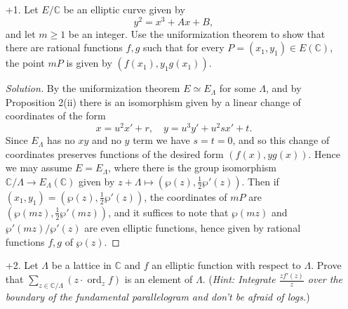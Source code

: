 \documentclass[a4paper]{article}
\theoremstyle{definition}
\DeclareMathOperator{\ord}{ord}
\newcommand{\C}{\mathbb{C}}
\begin{document}
\begin{enumerate}
    \item[+1.]
        Let $E/\C$ be an elliptic curve given by
        \begin{equation*}
            y^2 = x^3 + Ax + B,
        \end{equation*}
        and let $m\ge1$ be an integer. Use the uniformization theorem to show
        that there are rational functions $f,g$ such that for every
        $P=(x_1,y_1)\in E(\C)$, the point $mP$ is given by $(f(x_1),y_1g(x_1))$.

        \begin{proof}[Solution]
            By the uniformization theorem $E\simeq E_\Lambda$ for some $\Lambda$,
            and by Proposition 2(ii) there is an isomorphism given by a linear
            change of coordinates of the form
            \begin{equation*}
                x=u^2x'+r,\quad y=u^3y'+u^2sx'+t.
            \end{equation*}
            Since $E_\Lambda$ has no $xy$ and no $y$ term we have $s=t=0$, and
            so this change of coordinates preserves functions of the desired
            form $(f(x),yg(x))$. Hence we may assume $E=E_\Lambda$, where there
            is the group isomorphism $\C/\Lambda\to E_\Lambda(\C)$ given by
            $z+\Lambda\mapsto(\wp(z),\frac{1}{2}\wp'(z))$. Then if
            $(x_1,y_1)=(\wp(z),\frac{1}{2}\wp'(z))$, the coordinates of $mP$ are
            $(\wp(mz),\frac{1}{2}\wp'(mz))$, and it suffices to note that
            $\wp(mz)$ and $\wp'(mz)/\wp'(z)$ are even elliptic functions, hence
            given by rational functions $f,g$ of $\wp(z)$.
        \end{proof}

    \item[+2.] Let $\Lambda$ be a lattice in $\C$ and $f$ an elliptic function
        with respect to $\Lambda$. Prove that
        $\sum_{z\in\C/\Lambda}(z\cdot\ord_zf)$ is an element of $\Lambda$.
        (\textit{Hint: Integrate $\frac{zf'(z)}{z}$ over the boundary of the
        fundamental parallelogram and don't be afraid of logs.})


\end{enumerate}
\end{document}
